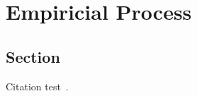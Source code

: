 \chapter{Empiricial Process}\label{chapter:introduction}

\section{Section}
Citation test~\parencite{latex}.